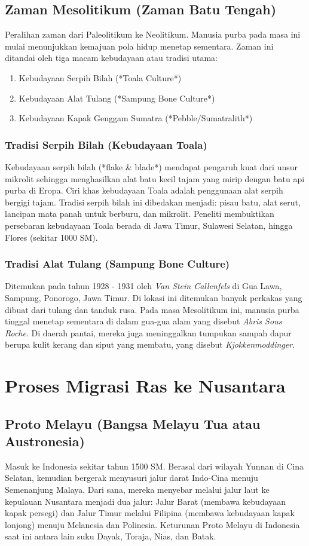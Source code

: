 \documentclass[12pt, a4paper]{article}
\begin{document}
\subsection{Zaman Mesolitikum (Zaman Batu Tengah)}
Peralihan zaman dari Paleolitikum ke Neolitikum. Manusia purba pada masa ini mulai menunjukkan kemajuan pola hidup menetap sementara. Zaman ini ditandai oleh tiga macam kebudayaan atau tradisi utama:
\begin{enumerate}
	\item Kebudayaan Serpih Bilah (*Toala Culture*)
	\item Kebudayaan Alat Tulang (*Sampung Bone Culture*)
	\item Kebudayaan Kapak Genggam Sumatra (*Pebble/Sumatralith*)
\end{enumerate}
\subsubsection{Tradisi Serpih Bilah (Kebudayaan Toala)}
Kebudayaan serpih bilah (*flake \& blade*) mendapat pengaruh kuat dari unsur mikrolit sehingga menghasilkan alat batu kecil tajam yang mirip dengan batu api purba di Eropa. Ciri khas kebudayaan Toala adalah penggunaan alat serpih bergigi tajam. Tradisi serpih bilah ini dibedakan menjadi: pisau batu, alat serut, lancipan mata panah untuk berburu, dan mikrolit. Peneliti membuktikan persebaran kebudayaan Toala berada di Jawa Timur, Sulawesi Selatan, hingga Flores (sekitar 1000 SM).
\subsubsection{Tradisi Alat Tulang (Sampung Bone Culture)}
Ditemukan pada tahun 1928 - 1931 oleh \textit{Van Stein Callenfels} di Gua Lawa, Sampung, Ponorogo, Jawa Timur. Di lokasi ini ditemukan banyak perkakas yang dibuat dari tulang dan tanduk rusa. Pada masa Mesolitikum ini, manusia purba tinggal menetap sementara di dalam gua-gua alam yang disebut \textit{Abris Sous Roche}. Di daerah pantai, mereka juga meninggalkan tumpukan sampah dapur berupa kulit kerang dan siput yang membatu, yang disebut \textit{Kjokkenmoddinger}.

\section{Proses Migrasi Ras ke Nusantara}
\subsection{Proto Melayu (Bangsa Melayu Tua atau Austronesia)}
Masuk ke Indonesia sekitar tahun 1500 SM. Berasal dari wilayah Yunnan di Cina Selatan, kemudian bergerak menyusuri jalur darat Indo-Cina menuju Semenanjung Malaya. Dari sana, mereka menyebar melalui jalur laut ke kepulauan Nusantara menjadi dua jalur: Jalur Barat (membawa kebudayaan kapak persegi) dan Jalur Timur melalui Filipina (membawa kebudayaan kapak lonjong) menuju Melanesia dan Polinesia. Keturunan Proto Melayu di Indonesia saat ini antara lain suku Dayak, Toraja, Nias, dan Batak.
\end{document}
